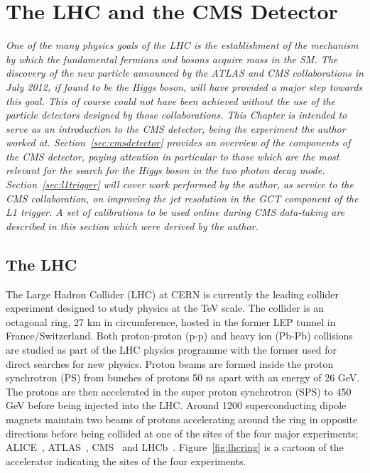 \chapter{The LHC and the CMS Detector}
\label{sec:detector}

\emph{One of the many physics goals of the LHC is the establishment of the mechanism by which 
the fundamental fermions and bosons acquire mass in the SM. The discovery of the new particle 
announced by the ATLAS and CMS collaborations in July 2012, if found to be the Higgs boson, will have provided 
a major step towards this goal. This of course could not have been achieved without the use
of the particle detectors designed by those collaborations. This Chapter is intended to serve as an 
introduction to the CMS detector, being the experiment the author worked at. Section~\ref{sec:cmsdetector}
provides an overview of the components of the CMS detector, paying attention in particular to those 
which are the most relevant for the search for the Higgs boson in the two photon decay mode. 
Section~\ref{sec:l1trigger} will cover work performed by the author, as service to the CMS collaboration, 
on improving the jet resolution in the GCT component of the L1 trigger. A set of calibrations
to be used online during CMS data-taking are described in this section which were derived by 
the author.}

\section{The LHC}
The Large Hadron Collider (LHC) at CERN is currently the leading collider experiment designed 
to study physics at the TeV scale. The collider is an octagonal 
ring, 27 km in circumference, hosted in the former LEP tunnel in France/Switzerland.  
Both proton-proton (p-p) and heavy ion (Pb-Pb) collisions are
studied as part of the LHC physics programme with the former used 
for direct searches for new physics. Proton beams are formed inside the proton synchrotron (PS)
from bunches of protons 50 ns apart with an energy of 26 GeV. The protons are then accelerated in the 
super proton synchrotron (SPS) to 450 GeV before being injected into the LHC. 
Around 1200 superconducting dipole magnets maintain two beams of protons accelerating around 
the ring in opposite directions before being collided at one of the sites of the four major experiments;
ALICE~\citep{aliceexperimient}, ATLAS~\citep{atlasexperiment}, CMS~\citep{cmsexperiment}
and LHCb~\citep{lhcbexperiment}. Figure~\ref{fig:lhcring} is a cartoon of the accelerator 
indicating the sites of the four experiments.

